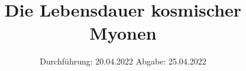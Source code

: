 

\subject{V01}
\title{Die Lebensdauer kosmischer Myonen}
\date{%
  Durchführung: 20.04.2022
  \hspace{3em}
  Abgabe: 25.04.2022
}



\maketitle
\thispagestyle{empty}
\tableofcontents
\newpage







\printbibliography{}



